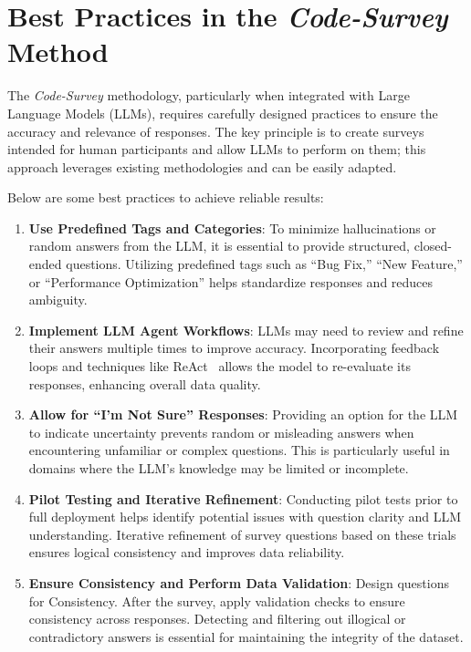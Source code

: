 \section{Best Practices in the \emph{Code-Survey} Method}
\label{sec:best_practices}
The \emph{Code-Survey} methodology, particularly when integrated with Large Language Models (LLMs), requires carefully designed practices to ensure the accuracy and relevance of responses. The key principle is to create surveys intended for human participants and allow LLMs to perform on them; this approach leverages existing methodologies and can be easily adapted.

Below are some best practices to achieve reliable results:

\begin{enumerate}
    \item \textbf{Use Predefined Tags and Categories}: To minimize hallucinations or random answers from the LLM, it is essential to provide structured, closed-ended questions. Utilizing predefined tags such as ``Bug Fix,'' ``New Feature,'' or ``Performance Optimization'' helps standardize responses and reduces ambiguity.

    \item \textbf{Implement LLM Agent Workflows}: LLMs may need to review and refine their answers multiple times to improve accuracy. Incorporating feedback loops and techniques like ReAct~\cite{yao2022react} allows the model to re-evaluate its responses, enhancing overall data quality.

    \item \textbf{Allow for ``I'm Not Sure'' Responses}: Providing an option for the LLM to indicate uncertainty prevents random or misleading answers when encountering unfamiliar or complex questions. This is particularly useful in domains where the LLM's knowledge may be limited or incomplete.

    \item \textbf{Pilot Testing and Iterative Refinement}: Conducting pilot tests prior to full deployment helps identify potential issues with question clarity and LLM understanding. Iterative refinement of survey questions based on these trials ensures logical consistency and improves data reliability.

    \item \textbf{Ensure Consistency and Perform Data Validation}: Design questions for Consistency. After the survey, apply validation checks to ensure consistency across responses. Detecting and filtering out illogical or contradictory answers is essential for maintaining the integrity of the dataset.
\end{enumerate}

